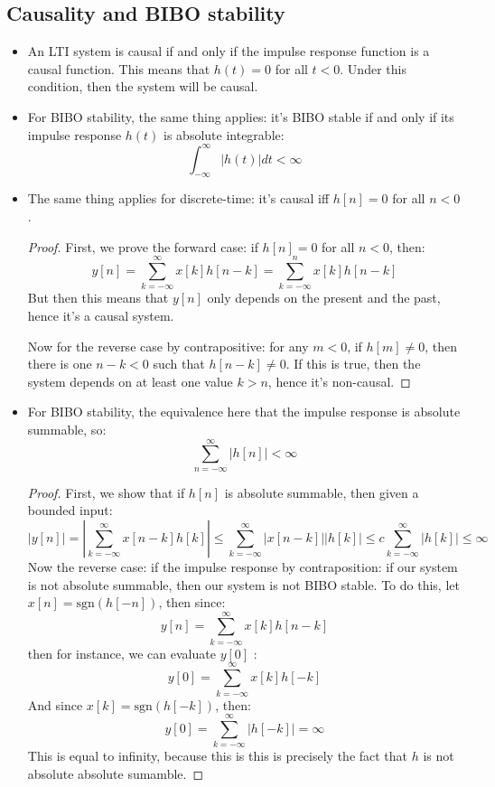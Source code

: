 \subsection{Causality and BIBO stability}
\begin{itemize}
	\item An LTI system is causal if and only if the impulse response function is a causal function. This means 
		that \( h(t) = 0 \) for all \( t < 0 \). Under this condition, then the system will be causal.
	\item For BIBO stability, the same thing applies: it's BIBO stable if and only if its impulse response 
		\( h(t) \) is absolute integrable:
		\[
		\int_{-\infty}^{\infty} |h(t)| dt < \infty 
		\] 
	\item The same thing applies for discrete-time: it's causal iff \( h[n] = 0 \) for all \( n < 0 \). 

		\begin{proof}
			First, we prove the forward case: if \( h[n] = 0 \) for all \( n < 0 \), then:
			\[
				y[n] = \sum_{k = -\infty}^{\infty}x[k] h[n - k] = \sum_{k = -\infty}^{n}x[k] h[n - k]
			\] 
			But then this means that \( y[n]  \) only depends on the present and the past, hence it's a causal 
			system. 

			Now for the reverse case by contrapositive: for any \( m < 0 \), if 
			\( h[m] \neq 0 \), then there is one \( n - k < 0 \) such that \( h[n - k] \neq 0  \). If this 
			is true, then the system depends on at least one value \( k > n \), hence it's non-causal. 
		\end{proof}
	\item For BIBO stability, the equivalence here that the impulse response is absolute summable, so:
		\[
			\sum_{n = -\infty}^{\infty}|h[n]| < \infty
		\] 

		\begin{proof}
			First, we show that if \( h[n] \) is absolute summable, then given a bounded input: 
			\[
				|y[n]| = \left| \sum_{k = -\infty}^{\infty} x[n - k] h[k] \right| \le \sum_{k = -\infty}^{\infty}
				|x[n - k]| |h[k]| \le c \sum_{k = -\infty}^{\infty} |h[k]| \le \infty
			\] 
			Now the reverse case: if the impulse response by contraposition: if our system is not 
			absolute summable, then our system is not BIBO stable. To do this, let \( x[n] = \mathrm{sgn}(h[-n]) \), 
			then since: 
			\[
				y[n] = \sum_{k = -\infty}^{\infty}x[k] h[n - k]
			\] 
			then for instance, we can evaluate \( y[0] \) :
			\[
				y[0] = \sum_{k= -\infty}^{\infty}x[k] h[-k]
			\] 
			And since \( x[k] = \mathrm{sgn}(h[-k]) \), then:
			\[
				y[0] = \sum_{k = -\infty}^{\infty} |h[-k]| = \infty
			\] 
			This is equal to infinity, because this is this is precisely the fact that \( h \) is not absolute 
			absolute sumamble.
		\end{proof}
\end{itemize}
